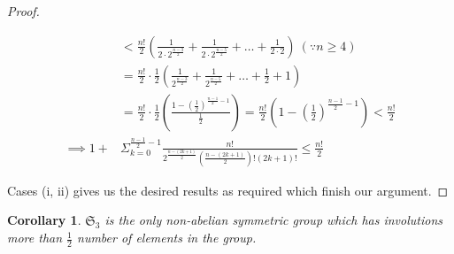 \documentclass[oneside]{amsart}
\theoremstyle{plain}
\newtheorem{corollary}[theorem]{Corollary}%
\theoremstyle{definition}
\theoremstyle{remark}
\begin{document}
\begin{proof}
\begin{itemize}
\begin{align*}
                & < \frac{n!}{2}\left(\frac{1}{2\cdot 2^{\frac{n - 3}{2}}} + \frac{1}{2\cdot 2^{\frac{n - 5}{2}}} + \ldots + \frac{1}{2\cdot 2}\right)\ (\because n \geq 4)\\
                &= \frac{n!}{2}\cdot\frac{1}{2}\left(\frac{1}{2^\frac{n - 3}{2}} + \frac{1}{2^\frac{n - 5}{2}} + \ldots + \frac{1}{2} + 1\right)\\
                &= \frac{n!}{2}\cdot\frac{1}{2}\left(\frac{1 - (\frac{1}{2})^{\frac{n - 1}{2} - 1}}{\frac{1}{2}}\right)= \frac{n!}{2}\left(1 - \left(\frac{1}{2}\right)^{\frac{n - 1}{2} - 1}\right) < \frac{n!}{2}\\
                \implies 1 + &\Sigma_{k = 0}^{\frac{n - 1}{2} - 1} \frac{n!}{2^{\frac{n - (2k + 1)}{2}}\left(\frac{n - (2k + 1)}{2}\right)!\left(2k + 1\right)!} \leq \frac{n!}{2}
            \end{align*}
        \end{itemize}
        Cases (i, ii) gives us the desired results as required which finish our argument.
    \end{proof}

    \begin{corollary}
        $\mathfrak{S}_3$ is the only non-abelian symmetric group which has involutions more than $\frac{1}{2}$ number of elements in the group.
    \end{corollary}
\end{document}
